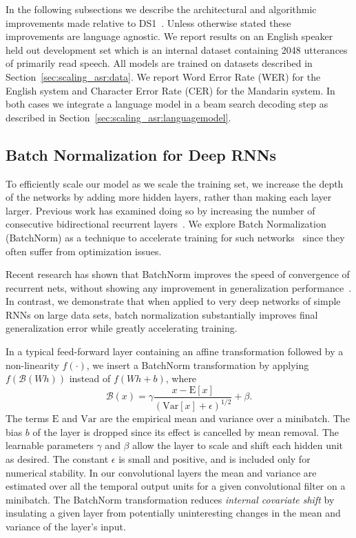 In the following subsections we describe the architectural and algorithmic
improvements made relative to DS1~\cite{hannun2014deepspeech}.  Unless
otherwise stated these improvements are language agnostic. We report results on
an English speaker held out development set which is an internal dataset
containing 2048 utterances of primarily read speech. All models are trained on
datasets described in Section~\ref{sec:scaling_asr:data}. We report Word Error
Rate (WER) for the English system and Character Error Rate (CER) for the
Mandarin system. In both cases we integrate a language model in a beam search
decoding step as described in Section~\ref{sec:scaling_asr:languagemodel}.


\subsection{Batch Normalization for Deep RNNs}
\label{sec:scaling_asr:bn}

To efficiently scale our model as we scale the training set, we increase the
depth of the networks by adding more hidden layers, rather than making each
layer larger. Previous work has examined doing so by increasing the number of
consecutive bidirectional recurrent layers~\cite{graves2013}. We explore Batch
Normalization (BatchNorm) as a technique to accelerate training for such
networks~\cite{ioffe2015batch} since they often suffer from optimization
issues. 

Recent research has shown that BatchNorm improves the speed of convergence of
recurrent nets, without showing any improvement in generalization
performance~\cite{laurent2016}. In contrast, we demonstrate that when applied
to very deep networks of simple RNNs on large data sets, batch normalization
substantially improves final generalization error while greatly accelerating
training. 

In a typical feed-forward layer containing an affine transformation followed by
a non-linearity $f(\cdot)$, we insert a BatchNorm transformation by applying
$f(\mathcal{B}(Wh))$ instead of $f(Wh + b)$, where
\begin{equation*}
    \mathcal{B}(x) = \gamma 
        \frac{x - \mathrm{E}[x]}{\left(\mathrm{Var}[x] + \epsilon\right)^{1/2}} + \beta.
\end{equation*}
The terms $\mathrm{E}$ and $\mathrm{Var}$ are the empirical mean and variance
over a minibatch. The bias $b$ of the layer is dropped since its effect is
cancelled by mean removal. The learnable parameters $\gamma$ and $\beta$ allow
the layer to scale and shift each hidden unit as desired. The constant
$\epsilon$ is small and positive, and is included only for numerical stability.
In our convolutional layers the mean and variance are estimated over all the
temporal output units for a given convolutional filter on a minibatch. The
BatchNorm transformation reduces \emph{internal covariate shift} by insulating
a given layer from potentially uninteresting changes in the mean and variance
of the layer's input.

